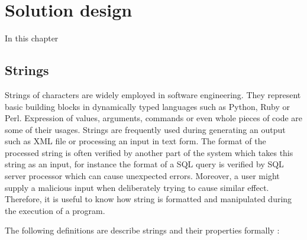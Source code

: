 \documentclass[12pt,final,oneside]{fithesis2}
\begin{document}
\chapter{Solution design}
\label{chap:design}

In this chapter


\section{Strings}

Strings of characters are widely employed in software engineering. They
represent basic building blocks in dynamically typed languages such as
Python, Ruby or Perl. Expression of values, arguments, commands or even
whole pieces of code are some of their usages. Strings are frequently
used during generating an output such as XML file or processing an input
in text form. The format of the processed string is often verified by
another part of the system which takes this string as an input, for
instance the format of a SQL query is verified by SQL server processor
which can cause unexpected errors. Moreover, a user might supply a
malicious input when deliberately trying to cause similar effect.
Therefore, it is useful to know how string is formatted and manipulated
during the execution of a program.

The following definitions are describe strings and their properties
formally \cite{Kozen97-1}:
\end{document}
